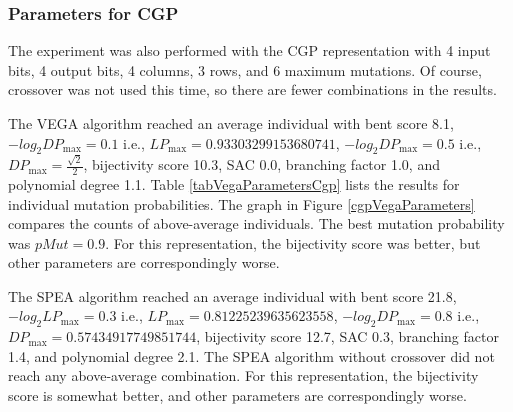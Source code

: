 \subsubsection{Parameters for CGP}
The experiment was also performed with the CGP representation with 4 input bits,
4 output bits, 4 columns, 3 rows, and 6 maximum mutations.
Of course, crossover was not used this time, so there are fewer
combinations in the results.

The VEGA algorithm reached an average individual with
bent score 8.1,
$-log_2{DP_{\max}} = 0.1$ i.e., $LP_{\max} = 0.93303299153680741$,
$-log_2{DP_{\max}} = 0.5$ i.e., $DP_{\max} = \frac{\sqrt{2}}{2}$,
bijectivity score 10.3,
SAC 0.0,
branching factor 1.0,
and polynomial degree 1.1.
Table \ref{tabVegaParametersCgp}
lists the results for individual mutation probabilities.
The graph in Figure \ref{cgpVegaParameters} compares the counts of above-average individuals.
The best mutation probability was $pMut = 0.9$.
For this representation, the bijectivity score was better, but other parameters are correspondingly worse.


The SPEA algorithm reached an average individual with
bent score 21.8,
$-log_2{LP_{\max}} = 0.3$ i.e., $LP_{\max} = 0.81225239635623558$,
$-log_2{DP_{\max}} = 0.8$ i.e., $DP_{\max} = 0.57434917749851744$,
bijectivity score 12.7,
SAC 0.3,
branching factor 1.4,
and polynomial degree 2.1.
The SPEA algorithm without crossover did not reach any above-average combination.
For this representation, the bijectivity score is somewhat better, and other parameters are correspondingly worse.


